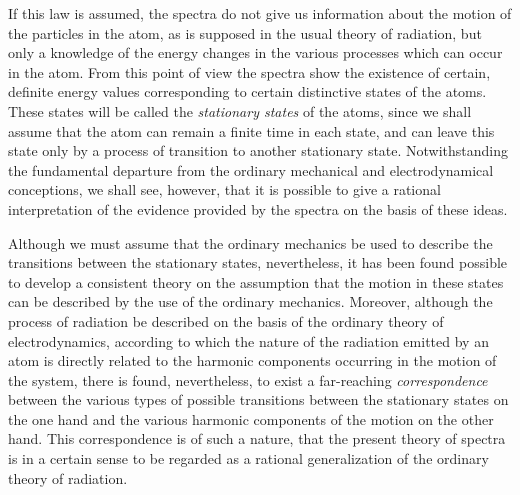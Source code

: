 If this law is assumed, the spectra do not give us information
about the motion of the particles in the atom, as is supposed in the
usual theory of radiation, but only a knowledge of the energy
changes in the various processes which can occur in the atom.
From this point of view the spectra show the existence of certain,
definite energy values corresponding to certain distinctive states
of the atoms. These states will be called the \emph{stationary states} of
the atoms, since we shall assume that the atom can remain a finite
time in each state, and can leave this state only by a process of
transition to another stationary state. Notwithstanding the fundamental
departure from the ordinary mechanical and electrodynamical
conceptions, we shall see, however, that it is possible to give a
rational interpretation of the evidence provided by the spectra on
the basis of these ideas.

Although we must assume that the ordinary mechanics 
be used to describe the transitions between the stationary states,
nevertheless, it has been found possible to develop a consistent
theory on the assumption that the motion in these states can be
described by the use of the ordinary mechanics. Moreover, although
the process of radiation  be described on the basis of the
ordinary theory of electrodynamics, according to which the nature
of the radiation emitted by an atom is directly related to the harmonic
components occurring in the motion of the system, there is
found, nevertheless, to exist a far-reaching \emph{correspondence} between
the various types of possible transitions between the stationary
states on the one hand and the various harmonic components of the
motion on the other hand. This correspondence is of such a nature,
that the present theory of spectra is in a certain sense to be regarded
as a rational generalization of the ordinary theory of radiation.

